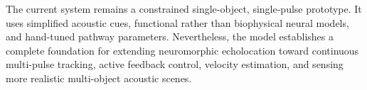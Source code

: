 The current system remains a constrained single-object, single-pulse prototype. It uses simplified acoustic cues, functional rather than biophysical neural models, and hand-tuned pathway parameters. Nevertheless, the model establishes a complete foundation for extending neuromorphic echolocation toward continuous multi-pulse tracking, active feedback control, velocity estimation, and sensing more realistic multi-object acoustic scenes.
